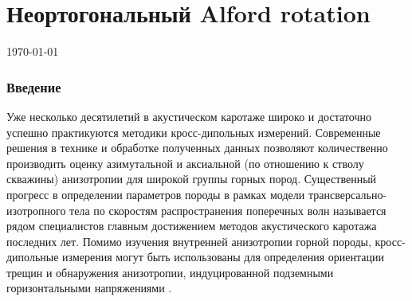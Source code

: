 \documentclass[a4paper,11pt]{article}
\begin{document}
\part*{Неортогональный Alford rotation}
\today

%
%
%
%

\section{Введение}
Уже несколько десятилетий в акустическом каротаже широко и достаточно успешно практикуются методики кросс-дипольных измерений. Современные решения в технике и обработке полученных данных позволяют количественно производить оценку азимутальной и аксиальной (по отношению к стволу скважины) анизотропии для широкой группы горных пород. Существенный прогресс в определении параметров породы в рамках модели трансверсально-изотропного тела по скоростям распространения поперечных волн называется рядом специалистов главным достижением методов акустического каротажа последних лет. Помимо изучения внутренней анизотропии горной породы, кросс-дипольные измерения могут быть использованы для определения ориентации трещин и обнаружения анизотропии, индуцированной подземными горизонтальными напряжениями \cite{Patterson2001}.
\end{document}
